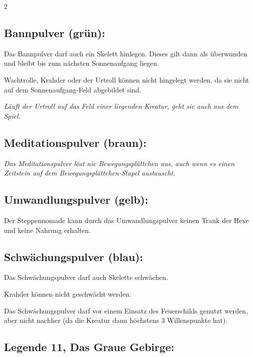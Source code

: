 \documentclass[10pt, a4paper, oneside]{book}
\newcommand{\fan}[1]{\textit{#1}}
\begin{document}
\begin{multicols*}{2}
\begin{bgcolor}
\subsection{Bannpulver (grün):}

Das Bannpulver darf auch ein Skelett hinlegen. Dieses gilt dann als überwunden und bleibt bis zum nächsten Sonnenaufgang liegen.
\supercite{mh-begleitheft,88552}

Wachtrolle, Krahder oder der Urtroll können nicht hingelegt werden, da sie nicht auf dem Sonnenaufgang-Feld abgebildet sind.
\supercite{90058}

\fan{Läuft der Urtroll auf das Feld einer liegenden Kreatur, geht sie auch aus dem Spiel.}


\subsection{Meditationspulver (braun):}

\fan{Das Meditationspulver löst nie Bewegungsplättchen aus, auch wenn es einen Zeitstein auf dem Bewegungsplättchen-Stapel austauscht.}




\subsection{Umwandlungspulver (gelb):}

Der Steppennomade kann durch das Umwandlungspulver keinen Trank der Hexe\supercite{mh-pulver} und keine Nahrung erhalten.
\supercite{88552}




\subsection{Schwächungspulver (blau):}

Das Schwächungspulver darf auch Skelette schwächen.
\supercite{mh-begleitheft}

Krahder können nicht geschwächt werden.
\supercite{88552}

Das Schwächungspulver darf vor einem Einsatz des Feuerschilds genutzt werden, aber nicht nachher (da die Kreatur dann höchstens 3 Willenspunkte hat).
\supercite{91413}




\subsection{Legende 11, Das Graue Gebirge:}


\end{bgcolor}
\end{multicols*}
\end{document}
